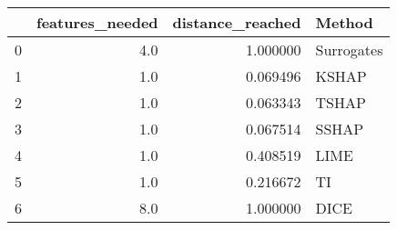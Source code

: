 \begin{tabular}{lrrl}
\toprule
{} &  features\_needed &  distance\_reached &      Method \\
\midrule
0 &              4.0 &          1.000000 &  Surrogates \\
1 &              1.0 &          0.069496 &       KSHAP \\
2 &              1.0 &          0.063343 &       TSHAP \\
3 &              1.0 &          0.067514 &       SSHAP \\
4 &              1.0 &          0.408519 &        LIME \\
5 &              1.0 &          0.216672 &          TI \\
6 &              8.0 &          1.000000 &        DICE \\
\bottomrule
\end{tabular}
